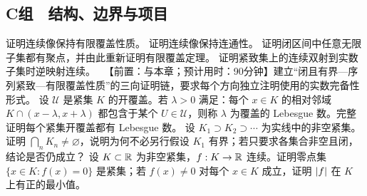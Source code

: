 \subsection*{C组　结构、边界与项目}
\begin{enumerate}[label=\textbf{\thechapter.\arabic*.},resume]
   证明连续像保持有限覆盖性质。
   证明连续像保持连通性。
   证明闭区间中任意无限子集都有聚点，并由此重新证明有限覆盖定理。
   证明紧致集上的连续双射到实数子集时逆映射连续。
  \ 【前置：与本章；预计用时：90分钟】建立“闭且有界—序列紧致—有限覆盖性质”的三向证明链，要求每个方向独立注明使用的实数完备性形式。
   设 \(\mathcal U\) 是紧集 \(K\) 的开覆盖。若 \(\lambda>0\) 满足：每个 \(x\in K\) 的相对邻域 \(K\cap(x-\lambda,x+\lambda)\) 都包含于某个 \(U\in\mathcal U\)，则称 \(\lambda\) 为覆盖的 Lebesgue 数。完整证明每个紧集开覆盖都有 Lebesgue 数。
   设 \(K_1\supset K_2\supset\cdots\) 为实线中的非空紧集。证明 \(\bigcap_nK_n\ne\varnothing\)，说明为何不必另行假设 \(K_1\) 有界；若只要求各集合非空且闭，结论是否仍成立？
   设 \(K\subset\mathbb{R}\) 为非空紧集，\(f:K\to\mathbb{R}\) 连续。证明零点集 \(\{x\in K:f(x)=0\}\) 是紧集；若 \(f(x)\ne0\) 对每个 \(x\in K\) 成立，证明 \(\left|f\right|\) 在 \(K\) 上有正的最小值。
\end{enumerate}
